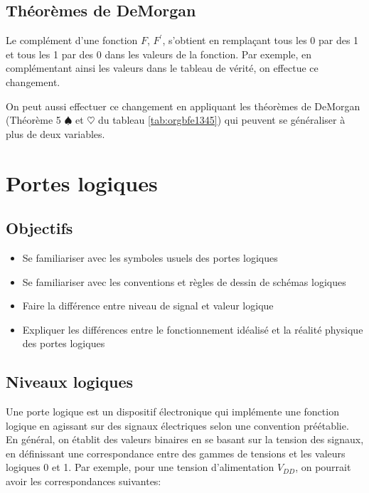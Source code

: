 \documentclass[11pt]{article}
\begin{document}
\subsection{Théorèmes de DeMorgan}
\label{sec:orgb12c1c6}

Le complément d'une fonction \(F\), \(F^\prime\), s'obtient en
remplaçant tous les 0 par des 1 et tous les 1 par des 0 dans les
valeurs de la fonction. Par exemple, en complémentant ainsi les
valeurs dans le tableau de vérité, on effectue ce changement.

On peut aussi effectuer ce changement en appliquant les théorèmes de
DeMorgan (Théorème 5 \(\spadesuit\) et \(\heartsuit\) du tableau \ref{tab:orgbfe1345}) qui
peuvent se généraliser à plus de deux variables.

\section{Portes logiques}
\label{sec:orgf74ebcf}

\subsection{Objectifs}
\label{sec:org6b52869}
\begin{itemize}
\item Se familiariser avec les symboles usuels des portes logiques
\item Se familiariser avec les conventions et règles de dessin de schémas
logiques
\item Faire la différence entre niveau de signal et valeur logique
\item Expliquer les différences entre le fonctionnement idéalisé
et la réalité physique des portes logiques
\end{itemize}

\subsection{Niveaux logiques}
\label{sec:orge521772}

Une porte logique est un dispositif électronique qui implémente une
fonction logique en agissant sur des signaux électriques selon une
convention préétablie. En général, on établit des valeurs binaires en
se basant sur la tension des signaux, en définissant une
correspondance entre des gammes de tensions et les valeurs logiques 0
et 1. Par exemple, pour une tension d'alimentation \(V_{DD}\), on
pourrait avoir les correspondances suivantes:
\end{document}
